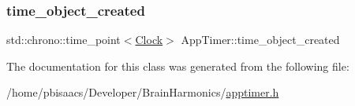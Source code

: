 \subsubsection{\texorpdfstring{time\+\_\+object\+\_\+created}{time\_object\_created}}
{\footnotesize\ttfamily std\+::chrono\+::time\+\_\+point$<$\mbox{\hyperlink{universe_8h_a0ef8d951d1ca5ab3cfaf7ab4c7a6fd80}{Clock}}$>$ App\+Timer\+::time\+\_\+object\+\_\+created\hspace{0.3cm}{\ttfamily [private]}}



The documentation for this class was generated from the following file\+:\begin{DoxyCompactItemize}
\item 
/home/pbisaacs/\+Developer/\+Brain\+Harmonics/\mbox{\hyperlink{apptimer_8h}{apptimer.\+h}}\end{DoxyCompactItemize}
